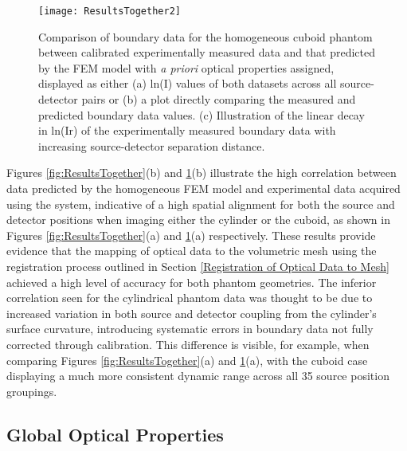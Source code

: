 \documentclass[twoside]{bhamthesis}
\theoremstyle{definition}
\begin{document}
\begin{figure}[!ht]
\centering
  \texttt{[image: ResultsTogether2]}
   \caption{Comparison of boundary data for the homogeneous cuboid phantom between calibrated experimentally measured data and that predicted by the FEM model with \textit{a priori} optical properties assigned, displayed as either (a) ln(I) values of both datasets across all source-detector pairs or (b) a plot directly comparing the measured and predicted boundary data values. (c) Illustration of the linear decay in ln(Ir) of the experimentally measured boundary data with increasing source-detector separation distance.}
     \label{fig:ResultsTogether2}
\end{figure}

Figures \ref{fig:ResultsTogether}(b) and \ref{fig:ResultsTogether2}(b) illustrate the high correlation between data predicted by the homogeneous FEM model and experimental data acquired using the system, indicative of a high spatial alignment for both the source and detector positions when imaging either the cylinder or the cuboid, as shown in
Figures \ref{fig:ResultsTogether}(a) and \ref{fig:ResultsTogether2}(a) respectively. These results provide evidence that the mapping of optical data to the volumetric mesh using the registration process outlined in Section \ref{Registration of Optical Data to Mesh} achieved a high level of accuracy for both phantom geometries. The inferior correlation seen for the cylindrical phantom data was thought to be due to increased variation in both source and detector coupling from the cylinder's surface curvature, introducing systematic errors in boundary data not fully corrected through calibration. This difference is visible, for example, when comparing Figures \ref{fig:ResultsTogether}(a) and \ref{fig:ResultsTogether2}(a), with the cuboid case displaying a much more consistent dynamic range across all 35 source position groupings.

\subsection{Global Optical Properties}
\end{document}
